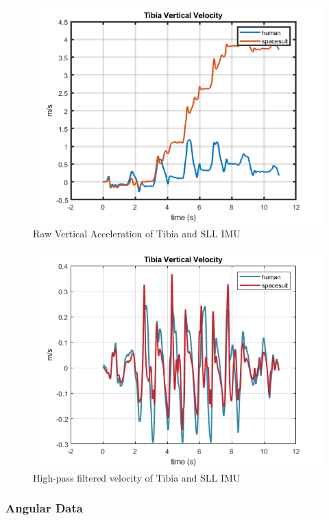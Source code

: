 \documentclass[defaultstyle,11pt]{comps}
\begin{document}
\begin{figure}
\hypertarget{fig:SA1-TibVertRaw}{%
\centering
\includegraphics{../fig/SA1/S3C0T1R_VVel.png}
\caption{Raw Vertical Acceleration of Tibia and SLL IMU}\label{fig:SA1-TibVertRaw}
}
\end{figure}

\begin{figure}
\hypertarget{fig:SA1-TibVertFilt}{%
\centering
\includegraphics{../fig/SA1/S3C0T1R_VVel_HPF.png}
\caption{High-pass filtered velocity of Tibia and SLL IMU}\label{fig:SA1-TibVertFilt}
}
\end{figure}

\hypertarget{angular-data}{%
\subsubsection{Angular Data}\label{angular-data}}
\end{document}

